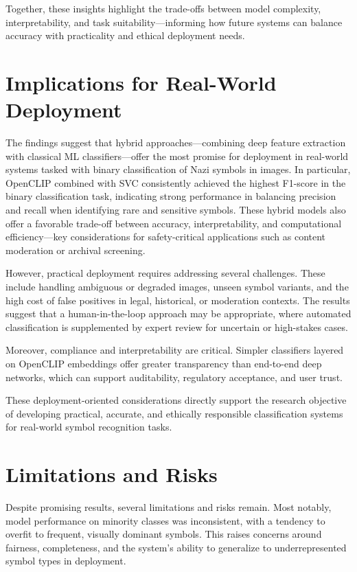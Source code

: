 Together, these insights highlight the trade-offs between model complexity, interpretability, and task
suitability—informing how future systems can balance accuracy with practicality and ethical deployment needs.

\section{Implications for Real-World Deployment}
\label{subsec:deployment-implications}

The findings suggest that hybrid approaches—combining deep feature extraction with classical \ac{ML}
classifiers—offer the most promise for deployment in real-world systems tasked with binary classification of Nazi
symbols in images. In particular, OpenCLIP combined with \ac{SVC} consistently achieved the highest F1-score in the
binary classification task, indicating strong performance in balancing precision and recall when identifying rare and
sensitive symbols. These hybrid models also offer a favorable trade-off between accuracy, interpretability, and
computational efficiency—key considerations for safety-critical applications such as content moderation or archival
screening.

However, practical deployment requires addressing several challenges. These include handling ambiguous or
degraded images, unseen symbol variants, and the high cost of false positives in legal, historical, or moderation
contexts. The results suggest that a human-in-the-loop approach may be appropriate, where automated classification is
supplemented by expert review for uncertain or high-stakes cases.

Moreover, compliance and interpretability are critical. Simpler classifiers layered on OpenCLIP embeddings offer
greater transparency than end-to-end deep networks, which can support auditability, regulatory acceptance, and user
trust.

These deployment-oriented considerations directly support the research objective of developing practical, accurate, and
ethically responsible classification systems for real-world symbol recognition tasks.

\section{Limitations and Risks}
\label{subsec:limitations}

Despite promising results, several limitations and risks remain. Most notably, model performance on minority classes
was inconsistent, with a tendency to overfit to frequent, visually dominant symbols. This raises concerns around
fairness, completeness, and the system's ability to generalize to underrepresented symbol types in deployment.


